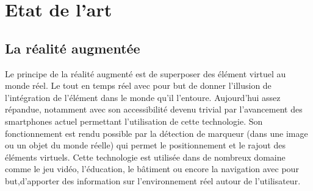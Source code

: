 \documentclass[12pt]{article}
\begin{document}
\section{Etat de l'art}
\subsection{La réalité augmentée}
Le principe de la réalité augmenté est de superposer des élément virtuel au monde réel. Le tout en temps réel avec pour but de donner l'illusion de l'intégration de l'élément dans le monde qu'il l'entoure. Aujourd'hui assez répandue, notamment avec son accessibilité devenu trivial par l'avancement des smartphones actuel permettant l'utilisation de cette technologie.
Son fonctionnement est rendu possible par la détection de marqueur (dans une image ou un objet du monde réelle) qui permet le positionnement et le rajout des éléments virtuels. 
Cette technologie est utilisée dans de nombreux domaine comme le jeu vidéo, l'éducation, le bâtiment ou encore la navigation avec pour but,d'apporter des information sur l'environnement réel autour de l'utilisateur.
\end{document}
